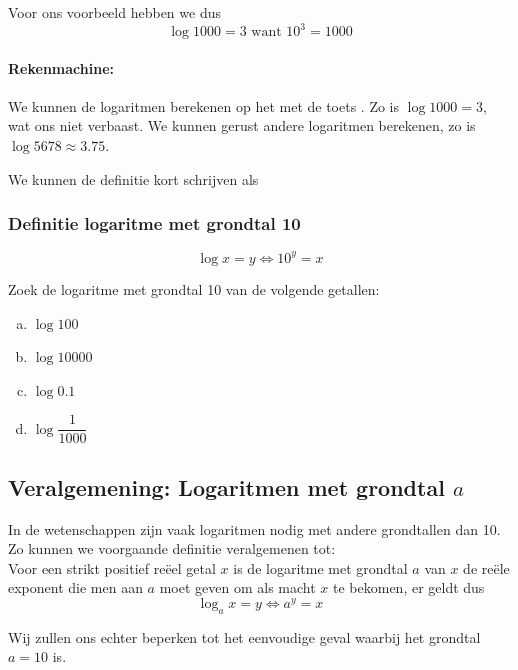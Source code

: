 \documentclass[12pt,twoside,a4paper]{article}
\begin{document}
Voor ons voorbeeld hebben we dus
$$\log 1000 = 3 \mbox{ want } 10^3 = 1000$$

\paragraph{Rekenmachine:} We kunnen de logaritmen berekenen op het  met de toets . Zo is $\log 1000 = 3$, wat ons niet verbaast. We kunnen gerust andere logaritmen berekenen, zo is $\log 5678 \approx 3.75$.

We kunnen de definitie kort schrijven als

\subsubsection*{Definitie logaritme met grondtal 10}
\begin{mdframed}
$$\log x = y \Leftrightarrow 10^y = x$$
\end{mdframed}

\begin{oefening}
Zoek de logaritme met grondtal 10 van de volgende getallen:\\
\begin{multicols}{2}
\begin{enumerate}[(a)]
  \itemsep1em
  \item $\log 100$
  \item $\log 10000$
  \item $\log 0.1$
  \item $\log \dfrac{1}{1000}$
\end{enumerate}
\end{multicols}
\end{oefening}

\subsection{Veralgemening: Logaritmen met grondtal $a$}

In de wetenschappen zijn vaak logaritmen nodig met andere grondtallen dan 10. Zo kunnen we voorgaande definitie veralgemenen tot:\\
Voor een strikt positief reëel getal $x$ is de logaritme met grondtal $a$ van $x$ de reële exponent die men aan $a$ moet geven om als macht $x$ te bekomen, er geldt dus
$$\log_a x = y \Leftrightarrow a^y = x$$

Wij zullen ons echter beperken tot het eenvoudige geval waarbij het grondtal $a=10$ is.
\end{document}
